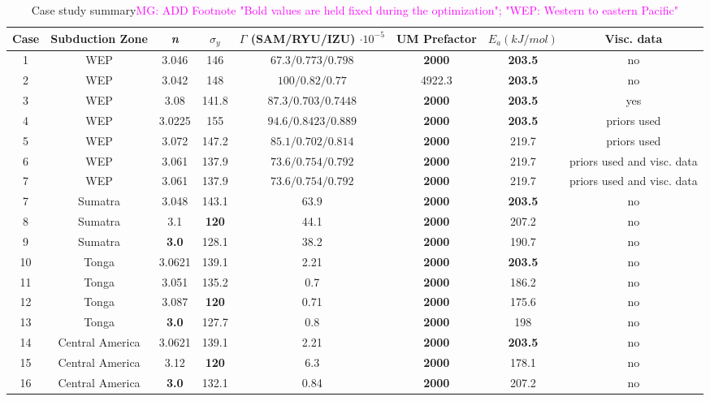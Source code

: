 \documentclass[12pt]{article}
\newcommand{\mgnote}[1]{\textcolor{magenta}{MG: #1}}
\begin{document}
\begin{table}

\centering

	\begin{table}[H]
		\caption{Case study summary\mgnote{ADD Footnote "Bold values are held fixed during the optimization"; "WEP: Western to eastern Pacific"}} %
		\centering  %
		\begin{tabular}{c c c c c c c c  } %
		\hline \hline                        %
		Case & Subduction Zone & \textit{n} &$\sigma_y$&$\Gamma$ (SAM/RYU/IZU) $\cdot 10^{-5}$ &UM Prefactor &$E_a (kJ/mol)$&Visc. data   \\ [0.5ex] %
		\hline                  %
          1 &WEP& 3.046 & 146 & $67.3/0.773/0.798$ & \textbf{2000} & \textbf{203.5} & no \\
	      	 2 &WEP& 3.042 & 148 & $100/0.82/0.77$ &  4922.3& \textbf{203.5} & no  \\
	        3 &WEP& 3.08 & 141.8 & $87.3/0.703/0.7448$ & \textbf{2000} & \textbf{203.5} & yes \\
	        4 &WEP& 3.0225 & 155 & $94.6/0.8423/0.889$ & \textbf{2000} & \textbf{203.5}& priors used \\
             5 &WEP& 3.072 & 147.2 & $85.1/0.702/0.814$ & \textbf{2000} & 219.7& priors used \\
             6 &WEP& 3.061 & 137.9 & $73.6/0.754/0.792$ & \textbf{2000} & 219.7& priors used and visc. data \\
             7 &WEP& 3.061 & 137.9 & $73.6/0.754/0.792$ & \textbf{2000} & 219.7& priors used and visc. data \\

                7 &Sumatra& 3.048 & 143.1 & $63.9$ &  \textbf{2000}& \textbf{203.5}& no \\

                 8 &Sumatra& 3.1 & \textbf{120} & 44.1 & \textbf{2000} & 207.2   &no\\
                  9 &Sumatra& \textbf{3.0} & 128.1 & 38.2 & \textbf{2000} & 190.7   &no\\
              10 &Tonga  & 3.0621 & 139.1 & 2.21& \textbf{2000} & \textbf{203.5} &no  \\              
               11 &Tonga  & 3.051 & 135.2 & 0.7& \textbf{2000} & 186.2 &no  \\             
              12 &Tonga  & 3.087 &  \textbf{120} & 0.71 &\textbf{2000} &175.6  &no  \\              
               13 &Tonga  & \textbf{3.0}  & 127.7 & 0.8 &\textbf{2000} &198  &no  \\             
               14 &Central America  & 3.0621 & 139.1 & 2.21& \textbf{2000} & \textbf{203.5} &no  \\           
                 15 &Central America  & 3.12 & \textbf{120} & 6.3& \textbf{2000} & 178.1 &no  \\       
                 16 &Central America  & \textbf{3.0} & 132.1 & 0.84& \textbf{2000}& 207.2 &no  \\        
          

\end{tabular}
\end{table}
\end{table}
\end{document}
